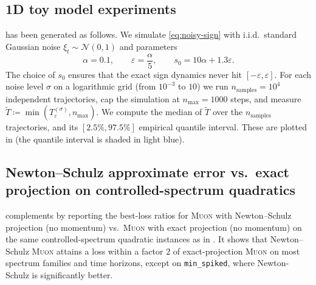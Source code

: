 \documentclass{article}
\theoremstyle{plain}
\theoremstyle{definition}
\theoremstyle{remark}
\newcommand{\stepsize}{\alpha}
\newcommand{\sv}{{s}} %
\newcommand{\Muon}{\textsc{Muon}}
\newcommand{\eps}{\varepsilon}
\begin{document}
\subsection{1D toy model experiments}
\label{app:noisy-sign-xps}
 has been generated as follows. 
We simulate \eqref{eq:noisy-sign} 
with i.i.d.\ standard Gaussian noise $\xi_t\sim\mathcal{N}(0,1)$ and parameters 
\[
  \stepsize = 0.1,\qquad
  \eps = \frac{\stepsize}{5},\qquad
  \sv_0 = 10\stepsize + 1.3\eps.
\]
The choice of $\sv_0$ ensures that the exact sign dynamics never hit $[-\eps,\eps]$.
For each noise level $\sigma$ on a logarithmic grid (from $10^{-3}$ to $10$) 
we run $n_{\mathrm{samples}}=10^4$ independent trajectories, 
cap the simulation at $n_{\max}=1000$ steps, and measure 
$\tilde T\coloneqq\min(T_\eps^{(\sigma)}, n_{\max})$. 
We compute the median of $\tilde T$ over the $n_{\mathrm{samples}}$ trajectories, 
and its $[2.5\%, 97.5\%]$ empirical quantile interval.
These are plotted in  (the quantile interval is shaded in light blue). 
\subsection{Newton--Schulz approximate error vs.\ exact projection on controlled-spectrum quadratics}
\label{app:controlled-spectrum-ns}

 complements  by reporting 
the best-loss ratios for \Muon{} with Newton--Schulz projection (no momentum) 
vs.\ \Muon{} with exact projection (no momentum) 
on the same controlled-spectrum quadratic instances as in .
It shows that Newton--Schulz \Muon{} attains a loss within a factor $2$ 
of exact-projection \Muon{} on most spectrum families and time horizons, 
except on \texttt{min\_spiked}, where Newton-Schulz is significantly better.
\end{document}
